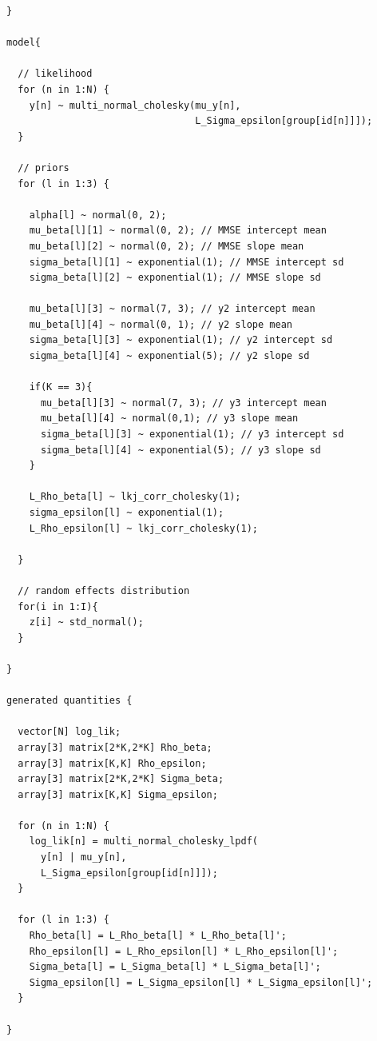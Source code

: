 \documentclass[12pt]{article}
\begin{document}
\begin{verbatim}
}

model{

  // likelihood
  for (n in 1:N) {
    y[n] ~ multi_normal_cholesky(mu_y[n], 
                                 L_Sigma_epsilon[group[id[n]]]);
  }

  // priors
  for (l in 1:3) {
    
    alpha[l] ~ normal(0, 2); 
    mu_beta[l][1] ~ normal(0, 2); // MMSE intercept mean
    mu_beta[l][2] ~ normal(0, 2); // MMSE slope mean
    sigma_beta[l][1] ~ exponential(1); // MMSE intercept sd
    sigma_beta[l][2] ~ exponential(1); // MMSE slope sd

    mu_beta[l][3] ~ normal(7, 3); // y2 intercept mean
    mu_beta[l][4] ~ normal(0, 1); // y2 slope mean
    sigma_beta[l][3] ~ exponential(1); // y2 intercept sd
    sigma_beta[l][4] ~ exponential(5); // y2 slope sd
    
    if(K == 3){
      mu_beta[l][3] ~ normal(7, 3); // y3 intercept mean
      mu_beta[l][4] ~ normal(0,1); // y3 slope mean
      sigma_beta[l][3] ~ exponential(1); // y3 intercept sd
      sigma_beta[l][4] ~ exponential(5); // y3 slope sd  
    }
    
    L_Rho_beta[l] ~ lkj_corr_cholesky(1);
    sigma_epsilon[l] ~ exponential(1);
    L_Rho_epsilon[l] ~ lkj_corr_cholesky(1);
    
  }
  
  // random effects distribution
  for(i in 1:I){
    z[i] ~ std_normal();
  }
  
}

generated quantities {

  vector[N] log_lik;
  array[3] matrix[2*K,2*K] Rho_beta;
  array[3] matrix[K,K] Rho_epsilon;
  array[3] matrix[2*K,2*K] Sigma_beta;
  array[3] matrix[K,K] Sigma_epsilon;

  for (n in 1:N) {
    log_lik[n] = multi_normal_cholesky_lpdf(
      y[n] | mu_y[n], 
      L_Sigma_epsilon[group[id[n]]]);
  }

  for (l in 1:3) {
    Rho_beta[l] = L_Rho_beta[l] * L_Rho_beta[l]';
    Rho_epsilon[l] = L_Rho_epsilon[l] * L_Rho_epsilon[l]';  
    Sigma_beta[l] = L_Sigma_beta[l] * L_Sigma_beta[l]';
    Sigma_epsilon[l] = L_Sigma_epsilon[l] * L_Sigma_epsilon[l]';
  }

}
\end{verbatim}

\pagebreak


\end{document}
